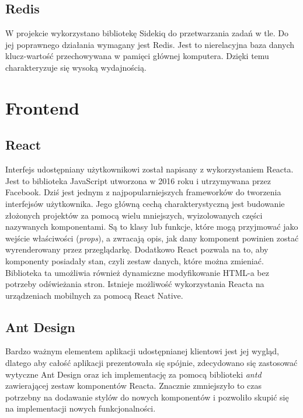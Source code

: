 \documentclass[declaration,shortabstract]{iithesis}
\begin{document}
\subsection{Redis}
W projekcie wykorzystano bibliotekę Sidekiq do przetwarzania zadań w tle. Do jej poprawnego działania wymagany jest Redis. Jest to nierelacyjna baza danych klucz-wartość przechowywana w pamięci głównej komputera. Dzięki temu charakteryzuje się wysoką wydajnością.
\section{Frontend}

\subsection{React}
Interfejs udostępniany użytkownikowi został napisany z wykorzystaniem Reacta. Jest to biblioteka JavaScript utworzona w 2016 roku i utrzymywana przez Facebook. Dziś jest jednym z najpopularniejszych frameworków do tworzenia interfejsów użytkownika. Jego główną cechą charakterystyczną jest budowanie złożonych projektów za pomocą wielu mniejszych, wyizolowanych części nazywanych komponentami. Są to klasy lub funkcje, które mogą przyjmować jako wejście właściwości (\textit{props}), a zwracają opis, jak dany komponent powinien zostać wyrenderowany przez przeglądarkę. Dodatkowo React pozwala na to, aby komponenty posiadały stan, czyli zestaw danych, które można zmieniać. Biblioteka ta umożliwia również dynamiczne modyfikowanie HTML-a bez potrzeby odświeżania stron. Istnieje możliwość wykorzystania Reacta na urządzeniach mobilnych za pomocą React Native.

\subsection{Ant Design}
Bardzo ważnym elementem aplikacji udostępnianej klientowi jest jej wygląd, dlatego aby całość aplikacji prezentowała się spójnie, zdecydowano się zastosować wytyczne Ant Design oraz ich implementację za pomocą biblioteki \textit{antd} zawierającej zestaw komponentów Reacta. Znacznie zmniejszyło to czas potrzebny na dodawanie stylów do nowych komponentów i pozwoliło skupić się na implementacji nowych funkcjonalności.
\end{document}

